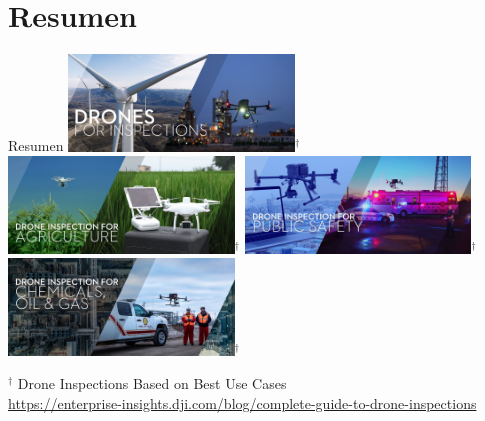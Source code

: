 \documentclass[
	12pt, %
	aspectratio=169, %
]{beamer}
\begin{document}
\section{Resumen}
\begin{frame}{Resumen}%
  \bigskip %
  \centering
  \includegraphics[width=0.45\textwidth,height=0.35\textheight]{DJI_B1}$^\dag$
  \hfil
  \includegraphics[width=0.45\textwidth,height=0.35\textheight]{DJI_B2}$^\dag$
  \vspace{2pt}
  \includegraphics[width=0.45\textwidth,height=0.35\textheight]{DJI_B5}$^\dag$ 
  \hfil
  \includegraphics[width=0.45\textwidth,height=0.35\textheight]{DJI_B4}$^\dag$\\
  \rule{0in}{1.2em}$^\dag$ \small Drone Inspections Based on Best Use Cases \\
  \tiny \url{https://enterprise-insights.dji.com/blog/complete-guide-to-drone-inspections}
\end{frame}
\end{document}
